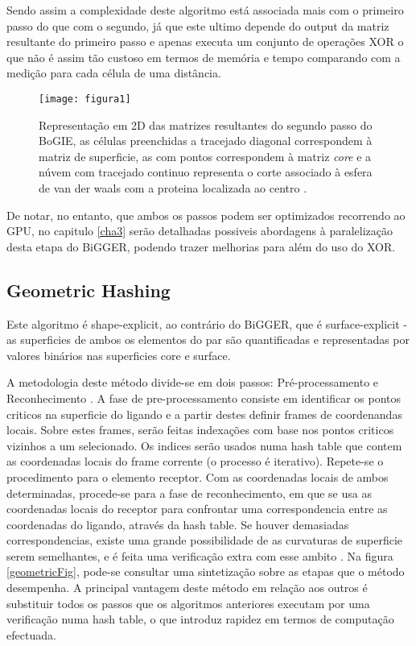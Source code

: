 Sendo assim a complexidade deste algoritmo está associada mais com o primeiro passo do que com o segundo, já que este ultimo depende do output da matriz resultante do primeiro passo e apenas executa um conjunto de operações XOR o que não é assim tão custoso em termos de memória e tempo comparando com a medição para cada célula de uma distância.

\begin{figure}[ht]
  \centering
    {\texttt{[image: figura1]}}
  \caption{Representação em 2D das matrizes resultantes do segundo passo do BoGIE, as células preenchidas a tracejado diagonal correspondem à matriz de superficie, as com pontos correspondem à matriz \textit{core} e a núvem com tracejado continuo representa o corte associado à esfera de van der waals com a proteina localizada ao centro \cite{biggerPaper}.}
  \label{fig:fig2subfig}
\end{figure}

De notar, no entanto, que ambos os passos podem ser optimizados recorrendo ao GPU, no capitulo \ref{cha3} serão detalhadas possiveis abordagens à paralelização desta etapa do BiGGER, podendo trazer melhorias para além do uso do XOR.

\subsection{Geometric Hashing}
Este algoritmo é shape-explicit, ao contrário do BiGGER, que é surface-explicit - as superficies de ambos os elementos do par são quantificadas e representadas por valores binários nas superficies core e surface.

A metodologia deste método divide-se em dois passos: Pré-processamento e Reconhecimento \cite{geometry}.
A fase de pre-processamento consiste em identificar os pontos criticos na superficie do ligando e a partir destes definir frames de coordenandas locais. Sobre estes frames, serão feitas indexações com base nos pontos criticos vizinhos a um selecionado. Os indices serão usados numa hash table que contem as coordenadas locais do frame corrente (o processo é iterativo). Repete-se o procedimento para o elemento receptor. Com as coordenadas locais de ambos determinadas, procede-se para a fase de reconhecimento, em que se usa as coordenadas locais do receptor para confrontar uma correspondencia entre as coordenadas do ligando, através da hash table. Se houver demasiadas correspondencias, existe uma grande possibilidade de as curvaturas de superficie serem semelhantes, e é feita uma verificação extra com esse ambito \cite{prediction}. Na figura \ref{geometricFig}, pode-se consultar uma sintetização sobre as etapas que o método desempenha. 
A principal vantagem deste método em relação aos outros é substituir todos os passos que os algoritmos anteriores executam por uma verificação numa hash table, o que introduz rapidez em termos de computação efectuada. 


